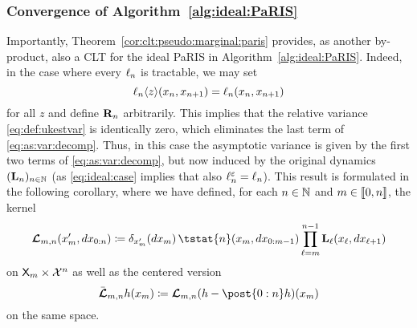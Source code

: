 \subsubsection{Convergence of Algorithm~\ref{alg:ideal:PaRIS}}

Importantly, Theorem~\ref{cor:clt:pseudo:marginal:paris} provides, as another by-product, also a CLT for the ideal PaRIS in Algorithm~\ref{alg:ideal:PaRIS}. Indeed, in the case where every $\ell_{n}$ is tractable, we may set 
\begin{equation} \label{eq:ideal:case}
\ukest{n}{z}(x_n, x_{n + 1}) = \ud{n}(x_n, x_{n + 1})
\end{equation} 
for all $z$ and define $\mathbf{R}_{n}$ arbitrarily. This implies that the relative variance \eqref{eq:def:ukestvar} is identically zero, which eliminates the last term of \eqref{eq:as:var:decomp}. Thus, in this case the asymptotic variance is given by the first two terms of \eqref{eq:as:var:decomp}, but now induced by the original dynamics $(\mathbf{L}_{n})_{n \in \mathbb{N}}$ (as \eqref{eq:ideal:case} implies that also $\ell^\varepsilon_{n} = \ell_{n}$). This result is formulated in the following corollary, where we have defined, for each $n \in \mathbb{N}$ and $m \in \llbracket 0, n \rrbracket$, the kernel  
\begin{equation} \label{eq:def:retrok}
    \retrok_{m, n}(x_m', \rmd x_{0:n}) \eqdef \delta_{x_m'}(\rmd x_m) \,  
    \tstat{n}(x_m, \rmd x_{0:m - 1})
    \prod_{\ell = m}^{n - 1} \uk{\ell}(x_\ell, \rmd x_{\ell + 1})
\end{equation}
on $\mathsf{X}_m \times \mathcal{X}^n$ as well as the centered version 
$$
\retroknorm_{m, n} h (x_m) \eqdef  \retrok_{m, n}(h - \post{0:n} h)(x_m) 
$$
on the same space. 

